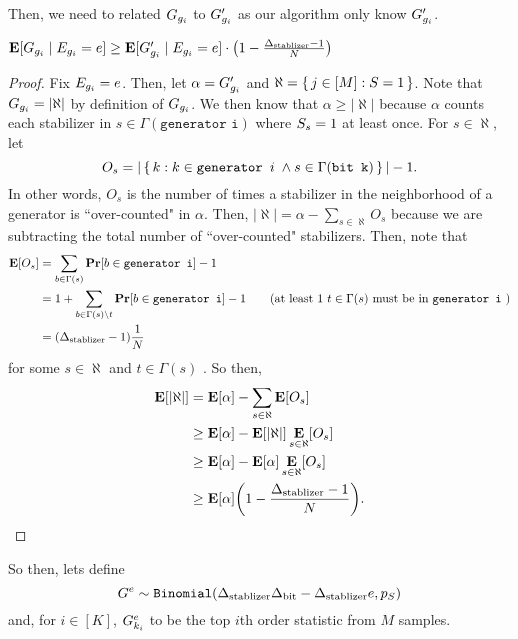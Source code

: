 Then, we need to related $G_{g_i}$ to $G'_{g_i}$ as our algorithm
only know $G'_{g_i}$.

\begin{lemma}{$\E[\genscoreRVCorrected_{g_i} \mid \lyingGenerator_{g_i} = e] \geq \E[\generatorscoreRV_{g_i} \mid \lyingGenerator_{g_i} = e] \cdot \mleft(1 - \frac{\DegStable - 1}{N}\mright)$}
\begin{proof}
	Fix $E_{g_i} = e$. Then, let $\alpha = G'_{g_i}$ and $\aleph = \set{j \in [M] : S= 1}$. 
	Note that $G_{g_i} = |\aleph|$ by definition of $G_{g_i}$.
	We then know that $\alpha \geq |\aleph|$ because $\alpha$ counts each stabilizer
	in $s \in \Gamma(\texttt{generator i})$ where $S_s = 1$ at least once.
	For $s \in \aleph$, let
	$$
		O_s = |\set{k : k \in \texttt{generator }i\; \wedge s \in \Gamma(\texttt{bit k})}| - 1.
	$$
	In other words, $O_s$ is the number of times a stabilizer in the neighborhood of a generator is
	``over-counted" in $\alpha$. Then, %
	$
		|\aleph| = \alpha - \sum_{s \in \aleph}O_s
	$ because we are subtracting the total number of ``over-counted" stabilizers.
	Then, note that
	\begin{align*}
		\E[O_s] &= \sum_{b \in \Gamma(s)} \Pr[b \in \texttt{generator i}] - 1\\
			&= 1 + \sum_{b \in \Gamma(s) \setminus t} \Pr[b \in \texttt{generator i}] - 1 \tag{at least $1$ $t \in \Gamma(s)$ must be in $\texttt{generator i}$ } \\
			&= \mleft(\DegStable - 1\mright) \frac{1}{N}
	\end{align*}
	for some $s \in \aleph$ and $t \in \Gamma(s)$ .
	So then, 
	\begin{align*}
		\E[|\aleph|] &= \E[\alpha] - \sum_{s \in \aleph}\E[O_s] \\
		&\geq \E[\alpha] - \E[|\aleph|] \E_{s \in \aleph}[O_s] \\
		&\geq \E[\alpha] - \E[\alpha] \E_{s \in \aleph}[O_s] \\
		&\geq \E[\alpha] \mleft(1 - \frac{\DegStable - 1}{N}\mright).
	\end{align*}
\end{proof}	
\end{lemma}

So then, lets define 
$$
	G^e \sim \texttt{Binomial}({\Delta_{\text{stablizer}}} {\Delta_{\text{bit}}} - {\Delta_{\text{stablizer}}} e, p_S)
$$
and, for $i \in [K]$, $G^e_{k_i}$ to be the top $i$th order statistic from $M$ samples.

